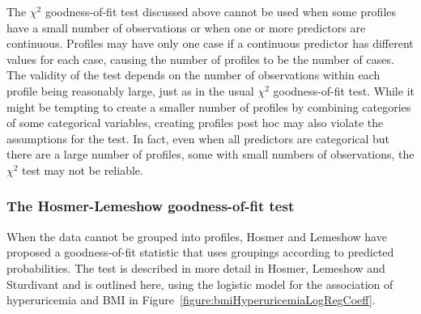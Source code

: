 The $\chi^2$ goodness-of-fit test discussed above cannot be used when some profiles have a small number of observations or when one or more predictors are continuous.  Profiles may have only one case if a continuous predictor has different values for each case, causing the number of profiles to be the number of cases.  The validity of the test depends on the number of observations within each profile being reasonably large, just as in the usual $\chi^2$ goodness-of-fit test.  While it might be tempting to create a smaller number of profiles by combining categories of some categorical variables, creating profiles post hoc may also violate the assumptions for the test.  In fact, even when all predictors are categorical but there are a large number of profiles, some with small numbers of observations, the $\chi^2$ test may not be reliable.


\subsubsection{The Hosmer-Lemeshow goodness-of-fit test}

 When the data cannot be grouped into profiles, Hosmer and Lemeshow have proposed a goodness-of-fit statistic that uses groupings according to predicted probabilities.   The test is described in more detail in Hosmer, Lemeshow and Sturdivant and is outlined here, using the logistic model for the association of hyperuricemia and BMI in Figure~\ref{figure:bmiHyperuricemiaLogRegCoeff}.

